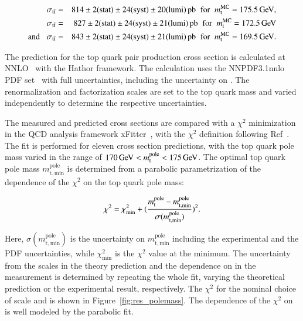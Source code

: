 \begin{eqnarray*}
\sigma_{\mathrm{t}\bar{\mathrm{t}}} & = & 814 \pm  2 ({\rm stat}) \pm 24 ({\rm syst}) \pm 20 ({\rm lumi}) \mbox{\ensuremath{\,\text{pb}}} \hspace{0.2cm}  \mathrm{for} \; \;  m_\mathrm{t}^{\mathrm{MC}} = 175.5 \,\text{Ge\hspace{-.08em}V}, \\
\sigma_{\mathrm{t}\bar{\mathrm{t}}} & = & 827 \pm 2 ({\rm stat}) \pm 24 ({\rm syst}) \pm 21 ({\rm lumi}) \mbox{\ensuremath{\,\text{pb}}} \hspace{0.2cm}  \mathrm{for} \;\; m_\mathrm{t}^{\mathrm{MC}} = 172.5 \,\text{Ge\hspace{-.08em}V} \\
\mathrm{and} \; \; \; \sigma_{\mathrm{t}\bar{\mathrm{t}}} & = & 843 \pm  2 ({\rm stat}) \pm 24 ({\rm syst}) \pm 21 ({\rm lumi}) \mbox{\ensuremath{\,\text{pb}}}  \hspace{0.2cm}  \mathrm{for} \;\; m_\mathrm{t}^{\mathrm{MC}} = 169.5 \,\text{Ge\hspace{-.08em}V}.
\end{eqnarray*} 

The prediction for the top quark pair production cross section is calculated at NNLO~\cite{PhysRevLett.109.132001,Czakon:2012zr,Czakon:2012pz,Czakon:2013goa} with the Hathor\cite{Aliev:2010zk} framework.
The calculation uses the NNPDF3.1nnlo PDF set~\cite{Ball:2017nwa} with full uncertainties, including the uncertainty on \as.
The renormalization and factorization scales are set to the top quark mass and varied independently to determine the respective uncertainties.

The measured and predicted \ttbar cross sections are compared with a $\chi^2$ minimization in the QCD analysis framework xFitter~\cite{Alekhin:2014irh}, with the $\chi^2$ definition following Ref~\cite{Abramowicz:2015mha}.
The fit is performed for eleven cross section predictions, with the top quark pole mass varied in the range of $170 \,\text{Ge\hspace{-.08em}V} < m_\mathrm{t}^{\mathrm{pole}} < 175 \,\text{Ge\hspace{-.08em}V}$.
The optimal top quark pole mass $m_\mathrm{t,min}^{\mathrm{pole}}$ is determined from a parabolic parametrization of the dependence of the $\chi^2$ on the top quark pole mass:

\begin{equation}
\chi^2 = \chi^2_{\mathrm{min}} + (\frac{m_\mathrm{t}^{\mathrm{pole}} - m_\mathrm{t,min}^{\mathrm{pole}}}{\sigma(m_\mathrm{t,min}^{\mathrm{pole}})})^2. 
\end{equation}

Here, $\sigma(m_\mathrm{t,min}^{\mathrm{pole}})$ is the uncertainty on $m_\mathrm{t,min}^{\mathrm{pole}}$ including the experimental and the PDF uncertainties, while $\chi^2_{\mathrm{min}}$ is the $\chi^2$ value at the minimum.
The uncertainty from the scales in the theory prediction and the dependence on \mtMC in the measurement is determined by repeating the whole fit, varying the theoretical prediction or the experimental result, respectively.
The $\chi^2$ for the nominal choice of scale and \mtMC is shown in Figure~\ref{fig:res_polemass}.
The dependence of the $\chi^2$ on \mtp is well modeled by the parabolic fit.

